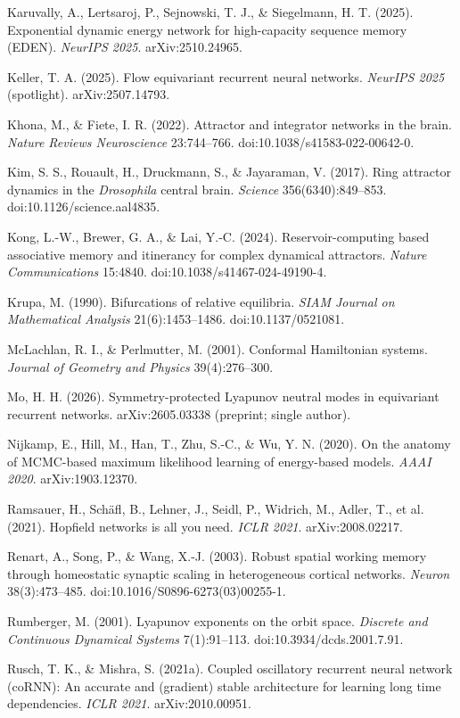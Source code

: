 \documentclass{article}
\begin{document}
{Karuvally, A., Lertsaroj, P., Sejnowski, T. J., \& Siegelmann, H. T. (2025). Exponential dynamic energy network for high-capacity sequence memory (EDEN). \emph{NeurIPS 2025}. arXiv:2510.24965.\par
Keller, T. A. (2025). Flow equivariant recurrent neural networks. \emph{NeurIPS 2025} (spotlight). arXiv:2507.14793.\par
Khona, M., \& Fiete, I. R. (2022). Attractor and integrator networks in the brain. \emph{Nature Reviews Neuroscience} 23:744--766. doi:10.1038/s41583-022-00642-0.\par
Kim, S. S., Rouault, H., Druckmann, S., \& Jayaraman, V. (2017). Ring attractor dynamics in the \emph{Drosophila} central brain. \emph{Science} 356(6340):849--853. doi:10.1126/science.aal4835.\par
Kong, L.-W., Brewer, G. A., \& Lai, Y.-C. (2024). Reservoir-computing based associative memory and itinerancy for complex dynamical attractors. \emph{Nature Communications} 15:4840. doi:10.1038/s41467-024-49190-4.\par
Krupa, M. (1990). Bifurcations of relative equilibria. \emph{SIAM Journal on Mathematical Analysis} 21(6):1453--1486. doi:10.1137/0521081.\par
McLachlan, R. I., \& Perlmutter, M. (2001). Conformal Hamiltonian systems. \emph{Journal of Geometry and Physics} 39(4):276--300.\par
Mo, H. H. (2026). Symmetry-protected Lyapunov neutral modes in equivariant recurrent networks. arXiv:2605.03338 (preprint; single author).\par
Nijkamp, E., Hill, M., Han, T., Zhu, S.-C., \& Wu, Y. N. (2020). On the anatomy of MCMC-based maximum likelihood learning of energy-based models. \emph{AAAI 2020}. arXiv:1903.12370.\par
Ramsauer, H., Sch\"afl, B., Lehner, J., Seidl, P., Widrich, M., Adler, T., et al. (2021). Hopfield networks is all you need. \emph{ICLR 2021}. arXiv:2008.02217.\par
Renart, A., Song, P., \& Wang, X.-J. (2003). Robust spatial working memory through homeostatic synaptic scaling in heterogeneous cortical networks. \emph{Neuron} 38(3):473--485. doi:10.1016/S0896-6273(03)00255-1.\par
Rumberger, M. (2001). Lyapunov exponents on the orbit space. \emph{Discrete and Continuous Dynamical Systems} 7(1):91--113. doi:10.3934/dcds.2001.7.91.\par
Rusch, T. K., \& Mishra, S. (2021a). Coupled oscillatory recurrent neural network (coRNN): An accurate and (gradient) stable architecture for learning long time dependencies. \emph{ICLR 2021}. arXiv:2010.00951.\par
}
\end{document}
